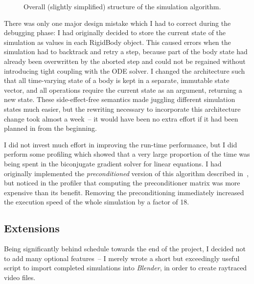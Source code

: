 \begin{figure}
\caption{Overall (slightly simplified) structure of the simulation algorithm.\label{flowchart}}
\end{figure}

There was only one major design mistake which I had to correct during the debugging phase: I had
originally decided to store the current state of the simulation as values in each
\textsf{RigidBody} object. This caused errors when the simulation had to backtrack and retry a
step, because part of the body state had already been overwritten by the aborted step and could
not be regained without introducing tight coupling with the ODE solver. I changed the architecture
such that all time-varying state of a body is kept in a separate, immutable state vector, and all
operations require the current state as an argument, returning a new state. These side-effect-free
semantics made juggling different simulation states much easier, but the rewriting necessary
to incorporate this architecture change took almost a week~-- it would have been no extra effort
if it had been planned in from the beginning.

I did not invest much effort in improving the run-time performance, but I did perform some
profiling which showed that a very large proportion of the time was being spent in the biconjugate
gradient solver for linear equations. I had originally implemented the \emph{preconditioned}
version of this algorithm described in~\cite{NRinC}, but noticed in the profiler that computing
the preconditioner matrix was more expensive than its benefit. Removing the preconditioning
immediately increased the execution speed of the whole simulation by a factor of 18.


\subsection{Extensions\label{extensions}}

Being significantly behind schedule towards the end of the project, I decided not to add many
optional features~-- I merely wrote a short but exceedingly useful script to import completed
simulations into \textsl{Blender}, in order to create raytraced video files.
